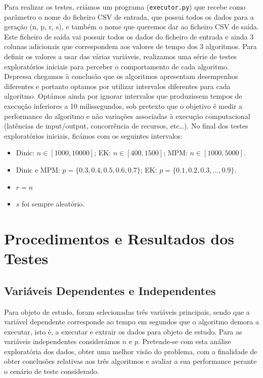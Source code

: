 \documentclass{uofa-eng-assignment}
\begin{document}
Para realizar os testes, criámos um programa (\texttt{executor.py}) que recebe como parâmetro o nome do ficheiro CSV de entrada, que possui todos os dados para a geração (n, p, r, s), e também o nome que queremos dar ao ficheiro CSV de saída. Este ficheiro de saída vai possuir todos os dados do ficheiro de entrada e ainda 3 colunas adicionais que correspondem aos valores de tempo dos 3 algoritmos. 
Para definir os valores a usar das várias variáveis, realizamos uma série de testes exploratórios iniciais para perceber o comportamento de cada algoritmo. Depressa chegamos à conclusão que os algoritmos apresentam desempenhos diferentes e portanto optamos por utilizar intervalos diferentes para cada algoritmo. Optámos ainda por ignorar intervalos que produzissem tempos de execução inferiores a 10 milissegundos, sob pretexto que o objetivo é medir a performance do algoritmo e não variações associadas à execução computacional (latências de input/output, concorrência de recursos, etc…).
No final dos testes exploratórios iniciais, ficámos com os seguintes intervalos:
\begin{itemize}
\item Dinic: $n\in[1000,10000]$; EK: $n\in[400,1500]$; MPM: $n\in[1000,5000]$. 
\item Dinic e MPM: $p=\{0.3, 0.4, 0.5, 0.6, 0.7\}$; EK: $p=\{0.1, 0.2, 0.3, ..., 0.9\}$.
\item $r=n$
\item $s$ foi sempre aleatório.
\end{itemize}

\section{Procedimentos e Resultados dos Testes }
\subsection{Variáveis Dependentes e Independentes }

Para objeto de estudo, foram selecionadas três variáveis principais, sendo que a variável dependente corresponde ao tempo em segundos que o algoritmo demora a executar, isto é, a executar e extrair os dados para objeto de estudo. Para as variáveis independentes considerámos $n$ e $p$.
Pretende-se com esta análise exploratória dos dados, obter uma melhor visão do problema, com a finalidade de obter conclusões relativas aos três algoritmos e avaliar a sua performance perante o cenário de teste considerado.
\end{document}

